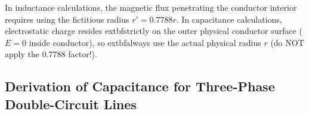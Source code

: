 \documentclass[11pt,a4paper]{article}
\newenvironment{Warn}[1][Important Exam Alert]{\begin{tcolorbox}[warnbox, title=#1]}{\end{tcolorbox}}
\begin{document}
\begin{Warn}[Critical Distinction: Radius in Inductance vs. Capacitance]
In inductance calculations, the magnetic flux penetrating the conductor interior requires using the fictitious radius $r' = 0.7788r$. In capacitance calculations, electrostatic charge resides 	extbf{strictly on the outer physical conductor surface} ($E=0$ inside conductor), so 	extbf{always use the actual physical radius $r$} (do NOT apply the $0.7788$ factor!).
\end{Warn}

\clearpage
\subsection{Derivation of Capacitance for Three-Phase Double-Circuit Lines}
\end{document}
